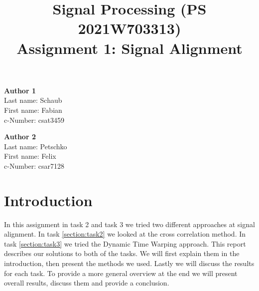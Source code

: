 \documentclass[11pt,a4paper]{article}
\title{\textbf{Signal Processing (PS 2021W703313) \\Assignment 1: Signal Alignment}}
\date{}
\begin{document}
\maketitle
\vspace{-3em}

\begin{tcolorbox}[
size=tight,
colback=white,
boxrule=0.2mm,
left=3mm,right=3mm, top=3mm, bottom=1mm
]
{\begin{multicols}{2}

\textbf{Author 1}       \\
Last name: Schaub              \\  %
First name: Fabian  \\  %
c-Number: csat3459               \\  %

\columnbreak

\textbf{Author 2}       \\
Last name: Petschko  \\  %
First name: Felix              \\  %
c-Number: csar7128               \\  %

\end{multicols}}
\end{tcolorbox}

\section{Introduction}

In this assignment in task 2 and task 3 we tried two different approaches at signal alignment. In task \ref{section:task2} we looked at the cross correlation method. In task \ref{section:task3} we tried the Dynamic Time Warping approach. 
This report describes our solutions to both of the tasks. We will first explain them in the introduction, then present the methods we used. Lastly we will discuss the results for each task. To provide a more general overview at the end we will present overall results, discuss them and provide a conclusion.
\end{document}
